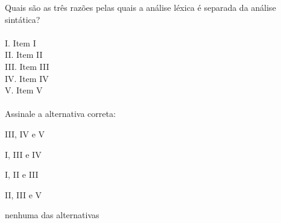 \question[10]

Quais são as três razões pelas quais a análise léxica é separada da análise sintática?\\
\\
I. Item I\\
II. Item II\\
III. Item III\\
IV. Item IV\\
V. Item V\\
\\
Assinale a alternativa correta:
\begin{choices}
\item III, IV e V
\item I, III e IV
\item I, II e III
\item II, III e V %
\item nenhuma das alternativas
\end{choices}
\answerline

